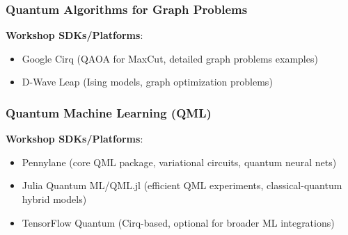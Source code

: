 \subsubsection{Quantum Algorithms for Graph Problems}
	
\textbf{Workshop SDKs/Platforms}:

\begin{itemize}
	\item Google Cirq (QAOA for MaxCut, detailed graph problems examples)
	\item D-Wave Leap (Ising models, graph optimization problems)
\end{itemize}


\subsubsection{Quantum Machine Learning (QML)}
	
\textbf{Workshop SDKs/Platforms}:

\begin{itemize}
	\item Pennylane (core QML package, variational circuits, quantum neural nets)
	\item Julia Quantum ML/QML.jl (efficient QML experiments, classical-quantum hybrid models)
	\item TensorFlow Quantum (Cirq-based, optional for broader ML integrations)
\end{itemize}

\pagebreak